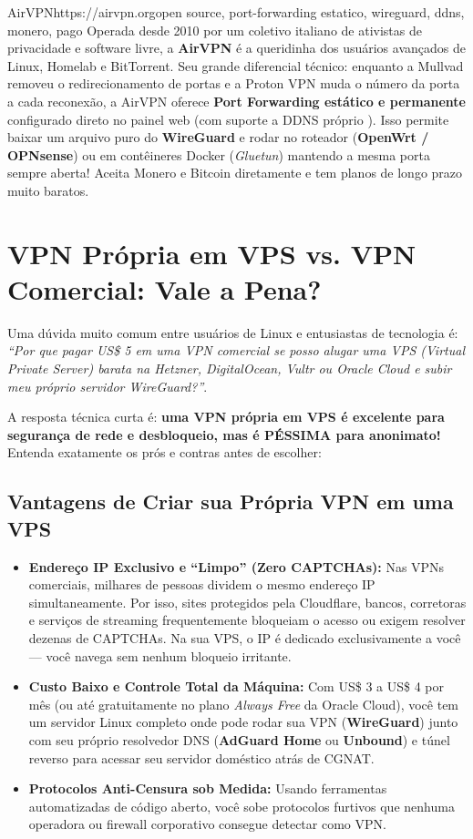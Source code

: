 \documentclass{pousadaguide}
\begin{document}
\begin{ferramenta}[recomendado,logo=airvpn]{AirVPN}{https://airvpn.org}{open source, port-forwarding estatico, wireguard, ddns, monero, pago}
Operada desde 2010 por um coletivo italiano de ativistas de privacidade e software livre, a \textbf{AirVPN} é a queridinha dos usuários avançados de Linux, Homelab e BitTorrent. Seu grande diferencial técnico: enquanto a Mullvad removeu o redirecionamento de portas e a Proton VPN muda o número da porta a cada reconexão, a AirVPN oferece \textbf{Port Forwarding estático e permanente} configurado direto no painel web (com suporte a DDNS próprio ). Isso permite baixar um arquivo  puro do \textbf{WireGuard} e rodar no roteador (\textbf{OpenWrt / OPNsense}) ou em contêineres Docker (\emph{Gluetun}) mantendo a mesma porta sempre aberta! Aceita Monero e Bitcoin diretamente e tem planos de longo prazo muito baratos. 
\end{ferramenta}

\section{VPN Própria em VPS vs. VPN Comercial: Vale a Pena?}

Uma dúvida muito comum entre usuários de Linux e entusiastas de tecnologia é: \emph{``Por que pagar US\$ 5 em uma VPN comercial se posso alugar uma VPS (Virtual Private Server) barata na Hetzner, DigitalOcean, Vultr ou Oracle Cloud e subir meu próprio servidor WireGuard?''}.

A resposta técnica curta é: \textbf{uma VPN própria em VPS é excelente para segurança de rede e desbloqueio, mas é PÉSSIMA para anonimato!} Entenda exatamente os prós e contras antes de escolher:

\subsection{Vantagens de Criar sua Própria VPN em uma VPS}

\begin{itemize}
  \item \textbf{Endereço IP Exclusivo e ``Limpo'' (Zero CAPTCHAs):} Nas VPNs comerciais, milhares de pessoas dividem o mesmo endereço IP simultaneamente. Por isso, sites protegidos pela Cloudflare, bancos, corretoras e serviços de streaming frequentemente bloqueiam o acesso ou exigem resolver dezenas de CAPTCHAs. Na sua VPS, o IP é dedicado exclusivamente a você — você navega sem nenhum bloqueio irritante.
  \item \textbf{Custo Baixo e Controle Total da Máquina:} Com US\$ 3 a US\$ 4 por mês (ou até gratuitamente no plano \emph{Always Free} da Oracle Cloud), você tem um servidor Linux completo onde pode rodar sua VPN (\textbf{WireGuard}) junto com seu próprio resolvedor DNS (\textbf{AdGuard Home} ou \textbf{Unbound}) e túnel reverso para acessar seu servidor doméstico atrás de CGNAT.
  \item \textbf{Protocolos Anti-Censura sob Medida:} Usando ferramentas automatizadas de código aberto, você sobe protocolos furtivos que nenhuma operadora ou firewall corporativo consegue detectar como VPN.
\end{itemize}
\end{document}
